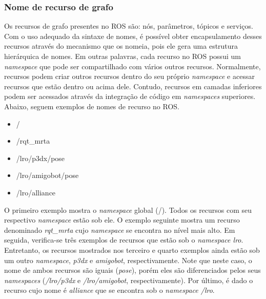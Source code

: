             \subsubsection{Nome de recurso de grafo} \label{subsubsec:ros_nomes_grafo}
            
                Os recursos de grafo presentes no ROS são: nós, parâmetros, tópicos e serviços. Com o uso adequado da sintaxe de nomes, é possível obter encapsulamento desses recursos através do mecanismo que os nomeia, pois ele gera uma estrutura hierárquica de nomes. Em outras palavras, cada recurso no ROS possui um \textit{namespace} que pode ser compartilhado com vários outros recursos. Normalmente, recursos podem criar outros recursos dentro do seu próprio \textit{namespace} e acessar recursos que estão dentro ou acima dele. Contudo, recursos em camadas inferiores podem ser acessados através da integração de código em \textit{namespaces} superiores. Abaixo, seguem exemplos de nomes de recurso no ROS.
                
                \begin{itemize}
                    \item /
                    
                    \item /rqt\_mrta
                    
                    \item /lro/p3dx/pose
                    
                    \item /lro/amigobot/pose
                    
                    \item /lro/alliance
                \end{itemize}
                
                O primeiro exemplo mostra o \textit{namespace} global (/). Todos os recursos com seu respectivo \textit{namespace} estão sob ele. O exemplo seguinte mostra um recurso denominado \textit{rqt\_mrta} cujo \textit{namespace} se encontra no nível mais alto. Em seguida, verifica-se três exemplos de recursos que estão sob o \textit{namespace lro}. Entretanto, os recursos mostrados nos terceiro e quarto exemplos ainda estão sob um outro \textit{namespace}, \textit{p3dx} e \textit{amigobot}, respectivamente. Note que neste caso, o nome de ambos recursos são iguais (\textit{pose}), porém eles são diferenciados pelos seus \textit{namespaces} (\textit{/lro/p3dx} e \textit{/lro/amigobot}, respectivamente). Por último, é dado o recurso cujo nome é \textit{alliance} que se encontra sob o \textit{namespace /lro}. 
                
